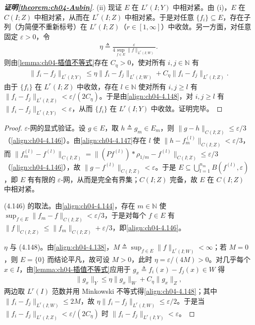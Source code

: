 \documentclass[../../main.tex]{subfiles}%
\begin{document}
\begin{proof}[\textbf{证明\cref{theorem:ch04-Aubin}}]
(ii) 现证 $E$ 在 $L^r(I;Y)$ 中相对紧。由 (i)，$E$ 在 $C(I;Z)$ 中相对紧，从而在 $L^r(I;Z)$ 中相对紧。于是对任意 $\{f_i\}\subseteq E$，存在子列（为简便不重新标号）在 $L^r(I;Z)$（$r\in[1,\infty]$）中收敛。另一方面，对任意固定 $\varepsilon>0$，令
\begin{align*}
\eta\triangleq\frac{\varepsilon}{4\sup_{f\in E}\|f\|_{L^r(I;W)}}.
\end{align*}
则由\cref{lemma:ch04-插值不等式}存在 $C_\eta>0$，使对所有 $i,j\in\mathbb{N}$ 有
\begin{align}
\|f_i-f_j\|_{L^r(I;Y)}\leqslant\eta\|f_i-f_j\|_{L^r(I;W)}+C_\eta\|f_i-f_j\|_{L^r(I;Z)}. \label{align:ch04-4.148}
\end{align}
由于 $\{f_i\}$ 在 $L^r(I;Z)$ 中收敛，存在 $l\in\mathbb{N}$ 使对所有 $i,j\geqslant l$ 有 $\|f_i-f_j\|_{L^r(I;Z)}<\varepsilon/(2C_\eta)$。于是由\eqref{align:ch04-4.148}，对 $i,j\geqslant l$ 有 $\|f_i-f_j\|_{L^r(I;Y)}<\varepsilon$，从而 $\{f_i\}$ 在 $L^r(I;Y)$ 中收敛。证明完毕。
\end{proof}

\begin{proof}
$\varepsilon$-网的显式验证。设 $g\in E$，取 $h\triangleq g_m\in E_m$，则 $\|g-h\|_{C(I;Z)}\leqslant\varepsilon/3$（\eqref{align:ch04-4.146}）。由\eqref{align:ch04-4.147}存在 $l$ 使 $\|h-f_m^{(l)}\|_{C(I;Z)}<\varepsilon/3$，而 $\|f_m^{(l)}-f^{(l)}\|_{C(I;Z)}=\|(Pf^{(l)})*\rho_{1/m}-f^{(l)}\|_{C(I;Z)}\leqslant\varepsilon/3$（\eqref{align:ch04-4.146}），故 $\|g-f^{(l)}\|_{C(I;Z)}<\varepsilon$。于是 $E\subseteq\bigcup_{l=1}^{n_m}B(f^{(l)},\varepsilon)$，即 $E$ 有有限的 $\varepsilon$-网，从而是完全有界集；$C(I;Z)$ 完备，故 $E$ 在 $C(I;Z)$ 中相对紧。

(4.146) 的取法。由\eqref{align:ch04-4.144}，存在 $m\in\mathbb{N}$ 使 $\sup_{f\in E}\|f_m-f\|_{C(I;Z)}<\varepsilon/3$，于是对每个 $f\in E$ 有 $\|f\|_{C(I;Z)}\leqslant\|f_m\|_{C(I;Z)}+\varepsilon/3$，即\eqref{align:ch04-4.146}。

$\eta$ 与 (4.148)。由\eqref{align:ch04-4.138}，$M\triangleq\sup_{f\in E}\|f\|_{L^r(I;W)}<\infty$；若 $M=0$，则 $E=\{0\}$ 而结论平凡，故可设 $M>0$，此时 $\eta=\varepsilon/(4M)>0$。对几乎每个 $x\in I$，由\cref{lemma:ch04-插值不等式}应用于 $g_x\triangleq f_i(x)-f_j(x)\in W$ 得
\begin{align*}
\|g_x\|_Y\leqslant\eta\|g_x\|_W+C_\eta\|g_x\|_Z ,
\end{align*}
两边取 $L^r(I)$ 范数并用 Minkowski 不等式得\eqref{align:ch04-4.148}；其中 $\|f_i-f_j\|_{L^r(I;W)}\leqslant2M$，故 $\eta\|f_i-f_j\|_{L^r(I;W)}\leqslant\varepsilon/2$。于是当 $\|f_i-f_j\|_{L^r(I;Z)}<\varepsilon/(2C_\eta)$ 时 $\|f_i-f_j\|_{L^r(I;Y)}<\varepsilon$。
\end{proof}
\end{document}
